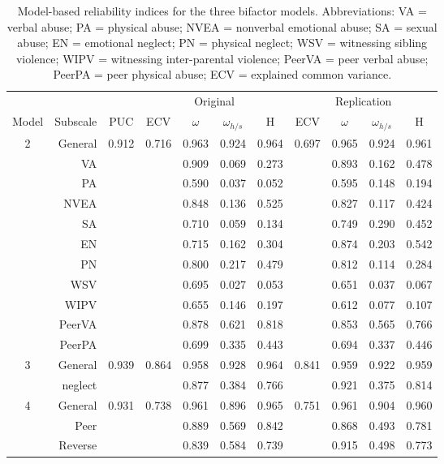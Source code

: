 \documentclass[letterpaper,man,natbib]{apa6}  %
\begin{document}
\begin{table}
\centering
\begin{tabular*}{\textwidth}{crccccccccc}
\toprule
& & & \multicolumn{4}{c}{Original} & \multicolumn{4}{c}{Replication} \\
\cmidrule(lr){4-7}\cmidrule(lr){8-11}
Model & Subscale & PUC & ECV & $\omega$ & $\omega_{h/s}$ & H & ECV & $\omega$ & $\omega_{h/s}$ & H \\
\midrule
2 & General  &  0.912&0.716 &  0.963 &   0.924 &  0.964&0.697 &  0.965 &   0.924 &  0.961 \\
& VA       &       &      &  0.909 &   0.069 &  0.273&      &  0.893 &   0.162 &  0.478 \\
& PA       &       &      &  0.590 &   0.037 &  0.052&      &  0.595 &   0.148 &  0.194 \\
& NVEA     &       &      &  0.848 &   0.136 &  0.525&      &  0.827 &   0.117 &  0.424 \\
& SA       &       &      &  0.710 &   0.059 &  0.134&     &  0.749 &   0.290 &  0.452 \\
& EN       &       &      &  0.715 &   0.162 &  0.304&     &  0.874 &   0.203 &  0.542 \\
& PN       &       &      &  0.800 &   0.217 &  0.479&     &  0.812 &   0.114 &  0.284 \\
& WSV      &       &      &  0.695 &   0.027 &  0.053&     &  0.651 &   0.037 &  0.067 \\
& WIPV     &       &      &  0.655 &   0.146 &  0.197&      &  0.612 &   0.077 &  0.107 \\
& PeerVA   &       &      &  0.878 &   0.621 &  0.818&     &  0.853 &   0.565 &  0.766 \\
& PeerPA   &       &      &  0.699 &   0.335 &  0.443&     &  0.694 &   0.337 &  0.446 \\
\midrule
3 & General &  0.939&0.864 &  0.958 &   0.928 &  0.964&0.841 &  0.959 &   0.922 &  0.959 \\
& neglect &       &      &  0.877 &   0.384 &  0.766&      &  0.921 &   0.375 &  0.814 \\
\midrule
4 & General &  0.931&0.738 &  0.961 &   0.896 &  0.965&0.751 &  0.961 &   0.904 &  0.960 \\
& Peer    &       &      &  0.889 &   0.569 &  0.842&      &  0.868 &   0.493 &  0.781 \\
& Reverse &       &      &  0.839 &   0.584 &  0.739&     &  0.915 &   0.498 &  0.773 \\
\bottomrule
\end{tabular*}
\captionsetup{width=1.\textwidth}
\caption{\normalfont Model-based reliability indices for the three bifactor models. Abbreviations: VA = verbal abuse; PA = physical abuse; NVEA = nonverbal emotional abuse; SA = sexual abuse; EN = emotional neglect; PN = physical neglect; WSV = witnessing sibling violence; WIPV = witnessing inter-parental violence; PeerVA = peer verbal abuse; PeerPA = peer physical abuse; ECV = explained common variance.}
\label{table:reliability}
\end{table}
\end{document}
